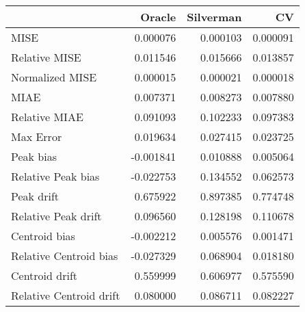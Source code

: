 \begin{tabular}{lrrr}
  \hline
 & Oracle & Silverman & CV \\ 
  \hline
MISE & 0.000076 & 0.000103 & 0.000091 \\ 
  Relative MISE & 0.011546 & 0.015666 & 0.013857 \\ 
  Normalized MISE & 0.000015 & 0.000021 & 0.000018 \\ 
  MIAE & 0.007371 & 0.008273 & 0.007880 \\ 
  Relative MIAE & 0.091093 & 0.102233 & 0.097383 \\ 
  Max Error & 0.019634 & 0.027415 & 0.023725 \\ 
  Peak bias & -0.001841 & 0.010888 & 0.005064 \\ 
  Relative Peak bias & -0.022753 & 0.134552 & 0.062573 \\ 
  Peak drift & 0.675922 & 0.897385 & 0.774748 \\ 
  Relative Peak drift & 0.096560 & 0.128198 & 0.110678 \\ 
  Centroid bias & -0.002212 & 0.005576 & 0.001471 \\ 
  Relative Centroid bias & -0.027329 & 0.068904 & 0.018180 \\ 
  Centroid drift & 0.559999 & 0.606977 & 0.575590 \\ 
  Relative Centroid drift & 0.080000 & 0.086711 & 0.082227 \\ 
   \hline
\end{tabular}
